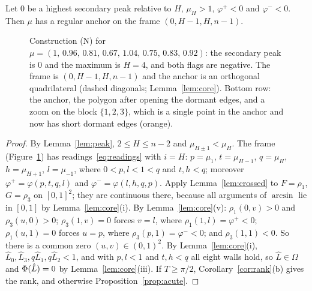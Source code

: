 \begin{proposition}[Statement (N)]\label{prop:N}
Let $0$ be a highest secondary peak relative to $H$, $\mu_H>1$,
$\varphi^+<0$ and $\varphi^-<0$. Then $\mu$ has a regular anchor on the frame
$(0,H-1,H,n-1)$.
\end{proposition}

\begin{figure}[t]
\centering
{}
\caption{Construction (N) for
$\mu=(1,\allowbreak\,0.96,\allowbreak\,0.81,\allowbreak\,0.67,\allowbreak\,1.04,\allowbreak\,0.75,\allowbreak\,0.83,\allowbreak\,0.92)$: the secondary
peak is $0$ and the maximum is $H=4$, and both flags are negative. The frame
is $(0,H-1,H,n-1)$ and the anchor is an orthogonal quadrilateral (dashed
diagonals; Lemma~\ref{lem:core}). Bottom row: the anchor, the polygon after
opening the dormant edges, and a zoom on the block $\{1,2,3\}$, which is a
single point in the anchor and now has short dormant edges (orange).}
\label{fig:N}
\end{figure}

\begin{proof}
By Lemma~\ref{lem:peak}, $2\le H\le n-2$ and $\mu_{H\pm1}<\mu_H$. The frame
(Figure~\ref{fig:N}) has readings~\eqref{eq:readings} with $i=H$:
$p=\mu_1$, $t=\mu_{H-1}$, $q=\mu_H$, $h=\mu_{H+1}$, $l=\mu_{-1}$, where
$0<p,l<1<q$ and $t,h<q$; moreover $\varphi^+=\varphi(p,t,q,l)$ and
$\varphi^-=\varphi(l,h,q,p)$. Apply Lemma~\ref{lem:crossed} to $F=\rho_1$,
$G=\rho_3$ on $[0,1]^2$; they are continuous there, because all arguments of
$\arcsin$ lie in $[0,1]$ by Lemma~\ref{lem:core}(i). By
Lemma~\ref{lem:core}(v): $\rho_1(0,v)>0$ and $\rho_3(u,0)>0$;
$\rho_3(1,v)=0$ forces $v=l$, where $\rho_1(1,l)=\varphi^+<0$;
$\rho_1(u,1)=0$ forces $u=p$, where $\rho_3(p,1)=\varphi^-<0$; and
$\rho_3(1,1)<0$. So there is a common zero $(u,v)\in(0,1)^2$. By
Lemma~\ref{lem:core}(i), $\hat L_0,\hat L_3,q\hat L_1,q\hat L_2<1$, and with
$p,l<1$ and $t,h<q$ all eight walls hold, so $\hat L\in\Omega$ and
$\Phi(\hat L)=0$ by Lemma~\ref{lem:core}(iii). If $T\ge\pi/2$,
Corollary~\ref{cor:rank}(b) gives the rank, and otherwise
Proposition~\ref{prop:acute}.
\end{proof}
